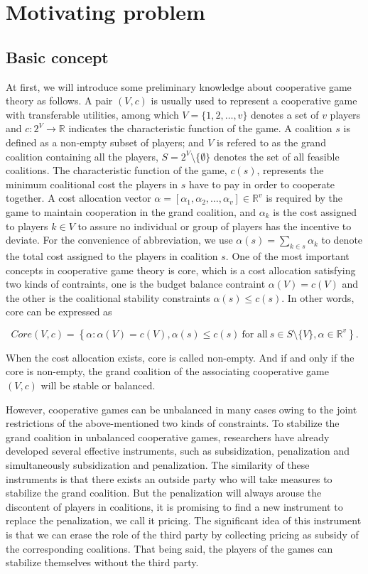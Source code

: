 \section{Motivating problem}

\subsection{Basic concept}

At first, we will introduce some preliminary knowledge about cooperative game theory as follows.
A pair $(V,c)$ is usually used to represent a cooperative game with transferable utilities, among which $V=\{1,2,\dots,v\}$ denotes a set of $v$ players and $c:2^{V}\to \mathbb{R}$ indicates the characteristic function of the game. A coalition $s$ is defined as a non-empty subset of players; and $V$ is refered to as the grand coalition containing all the players, $S=2^{V} \setminus\{\emptyset\}$ denotes the set of all feasible coalitions. The characteristic function of the game, $c(s)$, represents the minimum coalitional cost the players in $s$ have to pay in order to cooperate together.
A cost allocation vector $\alpha=[\alpha_{1},\alpha_{2},\dots,\alpha_{v}] \in \mathbb{R}^{v}$ is required by the game to maintain cooperation in the grand coalition, and $\alpha_{k}$ is the cost assigned to players $k \in V$ to assure no individual or group of players has the incentive to deviate. For the convenience of abbreviation, we use $\alpha(s)=\sum_{k\in{s}}\alpha_{k}$ to denote the total cost assigned to the players in coalition $s$.
One of the most important concepts in cooperative game theory is core, which is a cost allocation satisfying two kinds of contraints, one is the budget balance contraint {$\alpha(V)=c(V)$} and the other is the coalitional stability constraints {$\alpha(s) \leq c(s)$}. In other words, core can be expressed as

\[
Core(V,c)= \left\{\alpha:\alpha(V)=c(V), \alpha(s)\leq c(s)\ \text{for all}\ s \in S \setminus\{V\}, \alpha \in \mathbb{R}^{v} \right\}.
\]

When the cost allocation exists, core is called non-empty. And if and only if the core is non-empty, the grand coalition of the associating cooperative game $(V,c)$ will be stable or balanced.

However, cooperative games can be unbalanced in many cases owing to the joint restrictions of the above-mentioned two kinds of constraints. To stabilize the grand coalition in unbalanced cooperative games, researchers have already developed several effective instruments, such as subsidization, penalization and simultaneously subsidization and penalization. The
similarity of these instruments is that there exists an outside party who will take measures to stabilize the grand coalition. But the penalization will always arouse the discontent of players in coalitions, it is promising to find a new instrument to replace the penalization, we call it pricing.
The significant idea of this instrument is that we can erase the role of the third party by collecting pricing as subsidy of the corresponding coalitions.
That being said, the players of the games can stabilize themselves without the third party.

